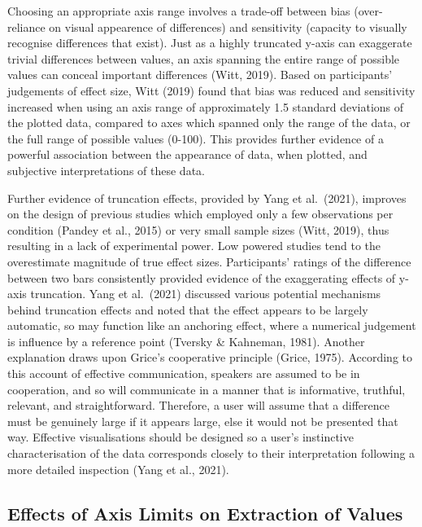 \documentclass[journal]{vgtc}                %
\begin{document}
Choosing an appropriate axis range involves a trade-off between bias (over-reliance on visual appearence of differences) and sensitivity (capacity to visually recognise differences that exist). Just as a highly truncated y-axis can exaggerate trivial differences between values, an axis spanning the entire range of possible values can conceal important differences (Witt, 2019). Based on participants' judgements of effect size, Witt (2019) found that bias was reduced and sensitivity increased when using an axis range of approximately 1.5 standard deviations of the plotted data, compared to axes which spanned only the range of the data, or the full range of possible values (0-100). This provides further evidence of a powerful association between the appearance of data, when plotted, and subjective interpretations of these data.

Further evidence of truncation effects, provided by Yang et al.~(2021), improves on the design of previous studies which employed only a few observations per condition (Pandey et al., 2015) or very small sample sizes (Witt, 2019), thus resulting in a lack of experimental power. Low powered studies tend to the overestimate magnitude of true effect sizes. Participants' ratings of the difference between two bars consistently provided evidence of the exaggerating effects of y-axis truncation. Yang et al.~(2021) discussed various potential mechanisms behind truncation effects and noted that the effect appears to be largely automatic, so may function like an anchoring effect, where a numerical judgement is influence by a reference point (Tversky \& Kahneman, 1981). Another explanation draws upon Grice's cooperative principle (Grice, 1975). According to this account of effective communication, speakers are assumed to be in cooperation, and so will communicate in a manner that is informative, truthful, relevant, and straightforward. Therefore, a user will assume that a difference must be genuinely large if it appears large, else it would not be presented that way. Effective visualisations should be designed so a user's instinctive characterisation of the data corresponds closely to their interpretation following a more detailed inspection (Yang et al., 2021).

\hypertarget{effects-of-axis-limits-on-extraction-of-values}{%
\subsection{Effects of Axis Limits on Extraction of Values}\label{effects-of-axis-limits-on-extraction-of-values}}
\end{document}
